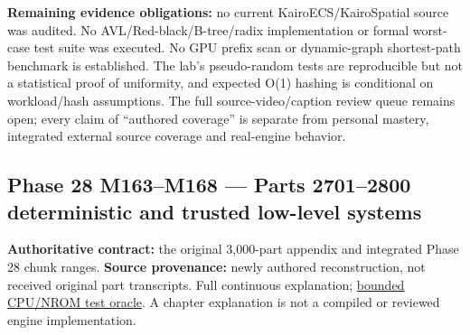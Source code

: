 \textbf{Remaining evidence obligations:} no current KairoECS/KairoSpatial source was audited. No AVL/Red-black/B-tree/radix implementation or formal worst-case test suite was executed. No GPU prefix scan or dynamic-graph shortest-path benchmark is established. The lab's pseudo-random tests are reproducible but not a statistical proof of uniformity, and expected O(1) hashing is conditional on workload/hash assumptions. The full source-video/caption review queue remains open; every claim of ``authored coverage'' is separate from personal mastery, integrated external source coverage and real-engine behavior.

\subsection{Phase 28 M163--M168 --- Parts 2701--2800 deterministic and trusted low-level systems}\label{appendix-fd090d982a15-phase-28-m163m168-parts-27012800-deterministic-and-trusted-low-level-systems}

\hypertarget{appendix-fd090d982a15-phase-28-m163m168-parts-27012800-deterministic-and-trusted-low-level-systems}{}

\textbf{Authoritative contract:} the original 3,000-part appendix and integrated Phase 28 chunk ranges. \textbf{Source provenance:} newly authored reconstruction, not received original part transcripts. {Full continuous explanation}; \hyperref[source-file-552a9e2296dc984412c8f06d]{bounded CPU/NROM test oracle}. A chapter explanation is not a compiled or reviewed engine implementation.

